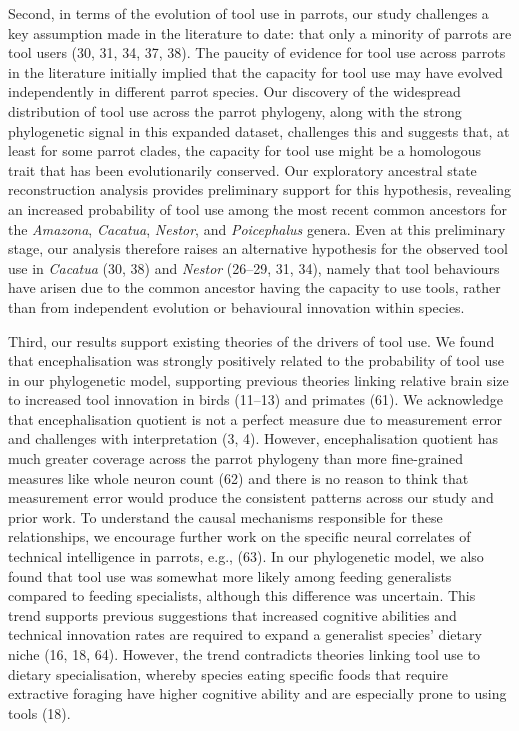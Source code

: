 \documentclass[
  man,floatsintext]{apa6}
\begin{document}
Second, in terms of the evolution of tool use in parrots, our study challenges a
key assumption made in the literature to date: that only a minority of parrots
are tool users (30, 31, 34, 37, 38).
The paucity of evidence for tool use across parrots in the literature initially
implied that the capacity for tool use may have evolved independently in
different parrot species. Our discovery of the widespread distribution of tool
use across the parrot phylogeny, along with the strong phylogenetic signal in
this expanded dataset, challenges this and suggests that, at least for some
parrot clades, the capacity for tool use might be a homologous trait that has
been evolutionarily conserved. Our exploratory ancestral state reconstruction
analysis provides preliminary support for this hypothesis, revealing an
increased probability of tool use among the most recent common ancestors for the
\emph{Amazona}, \emph{Cacatua}, \emph{Nestor}, and \emph{Poicephalus} genera. Even at this
preliminary stage, our analysis therefore raises an alternative hypothesis for
the observed tool use in \emph{Cacatua} (30, 38) and
\emph{Nestor} (26--29, 31, 34), namely that tool behaviours have arisen due to the
common ancestor having the capacity to use tools, rather than from independent
evolution or behavioural innovation within species.

Third, our results support existing theories of the drivers of tool use. We
found that encephalisation was strongly positively related to the probability of
tool use in our phylogenetic model, supporting previous theories linking
relative brain size to increased tool innovation in birds (11--13) and primates (61). We acknowledge that
encephalisation quotient is not a perfect measure due to measurement error and
challenges with interpretation (3, 4). However, encephalisation
quotient has much greater coverage across the parrot phylogeny than more
fine-grained measures like whole neuron count (62) and there is no reason
to think that measurement error would produce the consistent patterns across our
study and prior work. To understand the causal mechanisms responsible for these
relationships, we encourage further work on the specific neural correlates of
technical intelligence in parrots, e.g., (63). In our phylogenetic
model, we also found that tool use was somewhat more likely among feeding
generalists compared to feeding specialists, although this difference was
uncertain. This trend supports previous suggestions that increased cognitive
abilities and technical innovation rates are required to expand a generalist
species' dietary niche (16, 18, 64). However, the trend contradicts theories linking tool use to
dietary specialisation, whereby species eating specific foods that require
extractive foraging have higher cognitive ability and are especially prone to
using tools (18).
\end{document}
